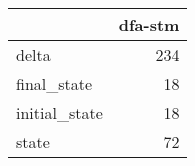 \begin{tabular}{lr}
\toprule
{} &  dfa-stm \\
\midrule
delta         &      234 \\
final\_state   &       18 \\
initial\_state &       18 \\
state         &       72 \\
\bottomrule
\end{tabular}
